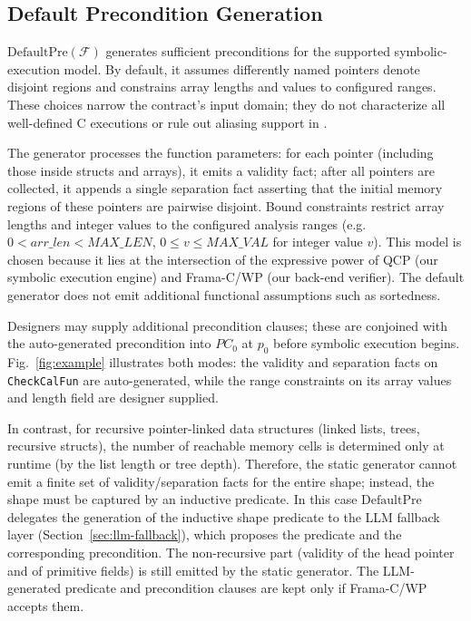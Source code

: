 \subsection{Default Precondition Generation}
\label{sec:default-pre}
{$\mathrm{DefaultPre}(\mathcal{F})$ generates sufficient preconditions for the supported symbolic-execution model. By default, it assumes differently named pointers denote disjoint regions and constrains array lengths and values to configured ranges. These choices narrow the contract's input domain; they do not characterize all well-defined C executions or rule out aliasing support in \toolname.}

The generator processes the function parameters: for each pointer (including those inside structs and arrays), it emits a validity fact; after all pointers are collected, it appends a single separation fact asserting that the initial memory regions of these pointers are pairwise disjoint. {Bound constraints restrict array lengths and integer values to the configured analysis ranges} (e.g.\ $0 < \mathit{arr\_len} < \mathit{MAX\_LEN}$, $0 \le v \le \mathit{MAX\_VAL}$ for integer value $v$). This model is chosen because it lies at the intersection of the expressive power of QCP (our symbolic execution engine) and Frama-C/WP (our back-end verifier). {The default generator does not emit additional functional assumptions such as sortedness.}



Designers may supply additional precondition clauses; these are conjoined with the auto-generated precondition into $PC_0$ at $p_0$ before symbolic execution begins. Fig.~\ref{fig:example} illustrates both modes: the validity and separation facts on \texttt{CheckCalFun} are auto-generated, while the range constraints on its array values and length field are designer supplied.

In contrast, for recursive pointer-linked data structures (linked lists, trees, recursive structs), the number of reachable memory cells is determined only at runtime (by the list length or tree depth). Therefore, the static generator cannot emit a finite set of validity/separation facts for the entire shape; instead, the shape must be captured by an inductive predicate. In this case $\mathrm{DefaultPre}$ delegates the generation of the inductive shape predicate to the LLM fallback layer (Section~\ref{sec:llm-fallback}), which proposes the predicate and the corresponding precondition. The non-recursive part (validity of the head pointer and of primitive fields) is still emitted by the static generator. The LLM-generated predicate and precondition clauses are kept only if Frama-C/WP accepts them.

 
